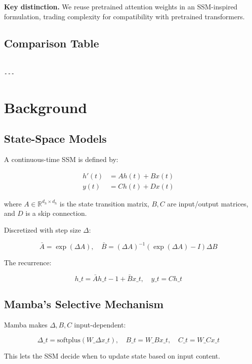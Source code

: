 \textbf{Key distinction.} We reuse pretrained attention weights in an SSM-inspired 
formulation, trading complexity for compatibility with pretrained transformers.



\subsection{Comparison Table}

\begin{lstlisting}

---
\end{lstlisting}

\section{Background}

\subsection{State-Space Models}

A continuous-time SSM is defined by:

\[
\begin{aligned}
h'(t) &= A h(t) + B x(t) \\
y(t) &= C h(t) + D x(t)
\end{aligned}
\tag{3.1}
\]

where $A \in \mathbb{R}^{d_h \times d_h}$ is the state transition matrix, 
$B, C$ are input/output matrices, and $D$ is a skip connection.

Discretized with step size $\Delta$:

\[
\bar{A} = \exp(\Delta A), \quad \bar{B} = (\Delta A)^{-1} (\exp(\Delta A) - I) \Delta B
\tag{3.2}
\]

The recurrence:

\[
h\_t = \bar{A} h\_{t-1} + \bar{B} x\_t, \quad y\_t = C h\_t
\tag{3.3}
\]

\subsection{Mamba's Selective Mechanism}

Mamba makes $\Delta, B, C$ input-dependent:

\[
\Delta\_t = \text{softplus}(W\_\Delta x\_t), \quad B\_t = W\_B x\_t, \quad C\_t = W\_C x\_t
\tag{3.4}
\]

This lets the SSM decide when to update state based on input content.

